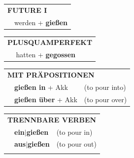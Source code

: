 \documentclass[10pt,a4paper]{revtex4-2}
\begin{document}
\begin{verbbox}
\begin{tabular}{rl}
    \multicolumn{2}{l}{\textbf{FUTURE I} }\\
   & werden + \textbf{gießen}\\
 
  \end{tabular}
\hfill
   \begin{tabular}{rl}
      \multicolumn{2}{l}{\textbf{PLUSQUAMPERFEKT}}\\
   & hatten + \textbf{gegossen}\\
  \end{tabular}

   \vspace{10pt}

   \begin{tabular}{lll}
      \multicolumn{3}{l}{\textbf{MIT PRÄPOSITIONEN}}\\
& \textbf{gießen in} + Akk & (to pour into)\\
& \textbf{gießen über} + Akk & (to pour over)\\
\end{tabular}
  \hfill
   \begin{tabular}{lll}
      \multicolumn{3}{l}{\textbf{TRENNBARE VERBEN}}\\
 & \textbf{ein$|$gießen} & (to pour in)\\
 & \textbf{aus$|$gießen} & (to pour out)\\
\vspace{10pt}
  \end{tabular}


  \vspace{-5pt}


\end{verbbox}
\end{document}

